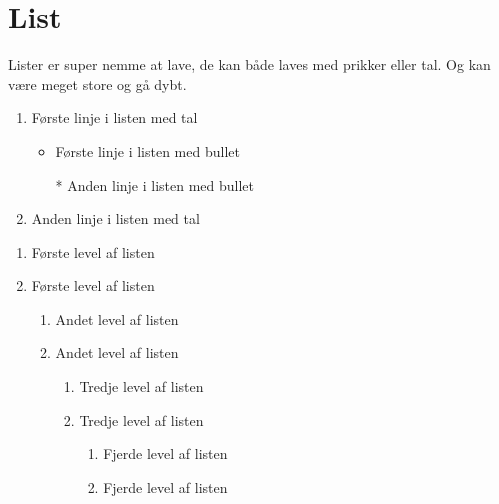 \section{List}

Lister er super nemme at lave, de kan både laves med prikker eller tal. Og kan være meget store og gå dybt.

\begin{enumerate}
    \item Første linje i listen med tal
    \begin{itemize}
        \item Første linje i listen med bullet
        \item[*] Anden linje i listen med bullet
    \end{itemize}
    \item Anden linje i listen med tal
\end{enumerate}

\begin{enumerate}
    \item Første level af listen
    \item Første level af listen
    \begin{enumerate}
        \item Andet level af listen
        \item Andet level af listen
        \begin{enumerate}
        \item Tredje level af listen
        \item Tredje level af listen
        \begin{enumerate}[I]
            \item Fjerde level af listen
            \item Fjerde level af listen
        \end{enumerate}
        \end{enumerate}
    \end{enumerate}
\end{enumerate}